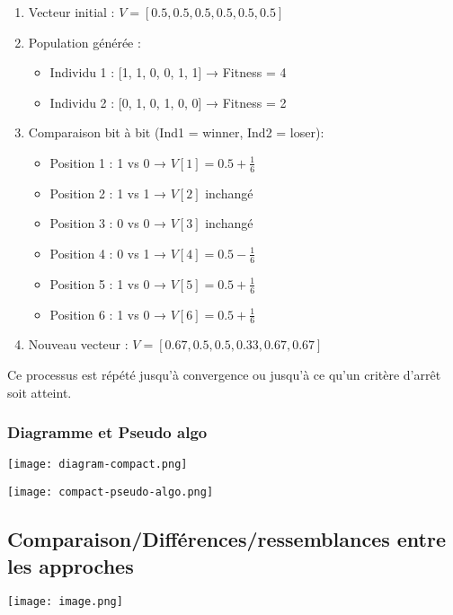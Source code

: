 \documentclass{article}
\begin{document}
\begin{enumerate}
   \item Vecteur initial : $V = [0.5, 0.5, 0.5, 0.5, 0.5, 0.5]$

   \item Population générée :
   \begin{itemize}
       \item Individu 1 : [1, 1, 0, 0, 1, 1] → Fitness = 4
       \item Individu 2 : [0, 1, 0, 1, 0, 0] → Fitness = 2
   \end{itemize}

   \item Comparaison bit à bit (Ind1 = winner, Ind2 = loser):
   \begin{itemize}
       \item Position 1 : 1 vs 0 → $V[1] = 0.5 + \frac{1}{6}$
       \item Position 2 : 1 vs 1 → $V[2]$ inchangé
       \item Position 3 : 0 vs 0 → $V[3]$ inchangé
       \item Position 4 : 0 vs 1 → $V[4] = 0.5 - \frac{1}{6}$
       \item Position 5 : 1 vs 0 → $V[5] = 0.5 + \frac{1}{6}$
       \item Position 6 : 1 vs 0 → $V[6] = 0.5 + \frac{1}{6}$
   \end{itemize}

   \item Nouveau vecteur : $V = [0.67, 0.5, 0.5, 0.33, 0.67, 0.67]$
\end{enumerate}

Ce processus est répété jusqu'à convergence ou jusqu'à ce qu'un critère d'arrêt soit atteint.

\subsubsection{Diagramme et Pseudo algo}

\texttt{[image: diagram-compact.png]}

\texttt{[image: compact-pseudo-algo.png]}

\subsection{Comparaison/Différences/ressemblances entre les approches}

\texttt{[image: image.png]}
\end{document}
